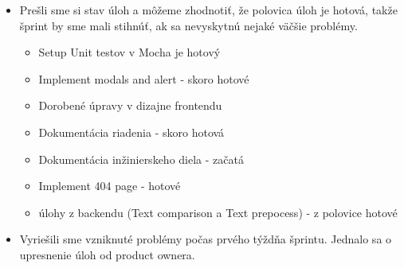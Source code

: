 \documentclass{article}
\begin{document}
    \begin{itemize}
        \item Prešli sme si stav úloh a môžeme zhodnotiť, že polovica úloh je hotová, takže šprint by sme mali stihnúť, ak sa nevyskytnú nejaké väčšie problémy.
        \begin{itemize}
            \item Setup Unit testov v Mocha je hotový
            \item Implement modals and alert - skoro hotové
            \item Dorobené úpravy v dizajne frontendu 
            \item Dokumentácia riadenia - skoro hotová
            \item Dokumentácia inžinierskeho diela - začatá
            \item Implement 404 page - hotové
            \item úlohy z backendu (Text comparison a Text prepocess) - z polovice hotové
        \end{itemize}
        \item Vyriešili sme vzniknuté problémy počas prvého týždňa šprintu. Jednalo sa o upresnenie úloh od product ownera. 
    \end{itemize}
\end{document}

